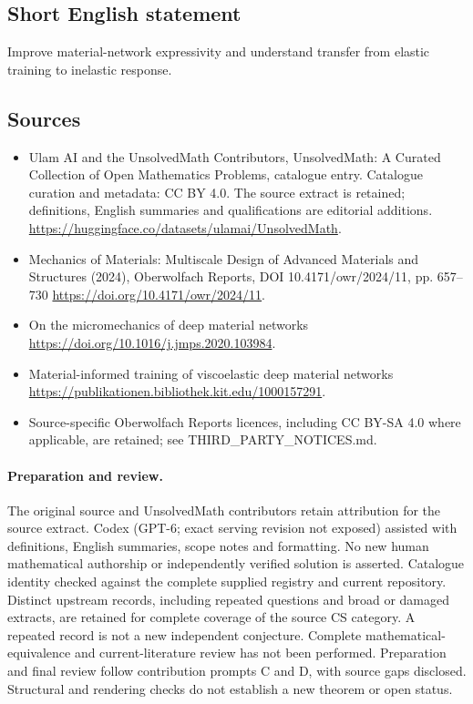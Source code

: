 \documentclass[11pt]{article}
\begin{document}
\subsection{Short English statement}
Improve material-network expressivity and understand transfer from elastic training to inelastic response.
\subsection{Sources}
\begin{itemize}
\item[\hypertarget{source:statement:1}{S1}] Ulam AI and the UnsolvedMath Contributors, UnsolvedMath: A Curated Collection of Open Mathematics Problems, catalogue entry. Catalogue curation and metadata: CC BY 4.0. The source extract is retained; definitions, English summaries and qualifications are editorial additions.
\url{https://huggingface.co/datasets/ulamai/UnsolvedMath}.
\item[\hypertarget{source:statement:2}{S2}] Mechanics of Materials: Multiscale Design of Advanced Materials and Structures (2024), Oberwolfach Reports, DOI 10.4171/owr/2024/11, pp. 657--730
\url{https://doi.org/10.4171/owr/2024/11}.
\item[\hypertarget{source:statement:3}{S3}] On the micromechanics of deep material networks
\url{https://doi.org/10.1016/j.jmps.2020.103984}.
\item[\hypertarget{source:statement:4}{S4}] Material-informed training of viscoelastic deep material networks
\url{https://publikationen.bibliothek.kit.edu/1000157291}.
\item Source-specific Oberwolfach Reports licences, including CC BY-SA 4.0 where applicable, are retained; see THIRD\_PARTY\_NOTICES.md.
\end{itemize}
\paragraph{Preparation and review.}
The original source and UnsolvedMath contributors retain attribution for the source extract. Codex (GPT-6; exact serving revision not exposed) assisted with definitions, English summaries, scope notes and formatting. No new human mathematical authorship or independently verified solution is asserted. Catalogue identity checked against the complete supplied registry and current repository. Distinct upstream records, including repeated questions and broad or damaged extracts, are retained for complete coverage of the source CS category. A repeated record is not a new independent conjecture. Complete mathematical-equivalence and current-literature review has not been performed. Preparation and final review follow contribution prompts C and D, with source gaps disclosed. Structural and rendering checks do not establish a new theorem or open status.
\label{end:statement}
\end{document}
